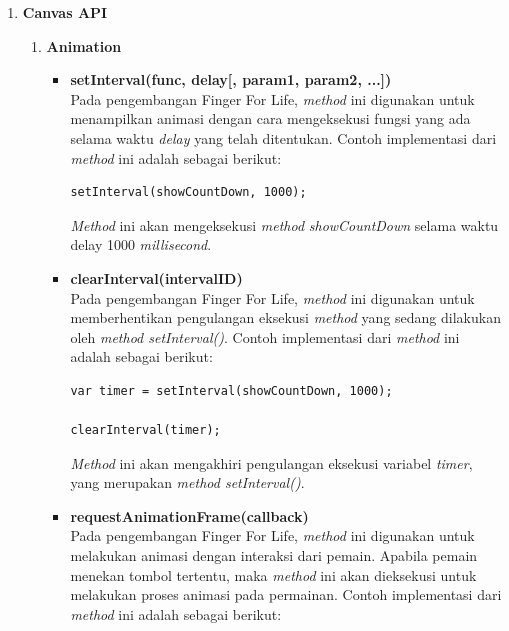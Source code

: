 \begin{enumerate}
	\item \textbf{Canvas API}
	\begin{enumerate}
		\item \textbf{Animation}
		\begin{itemize}
			\item \textbf{setInterval(func, delay[, param1, param2, ...])} \\
			Pada pengembangan Finger For Life, \textit{method} ini digunakan untuk menampilkan animasi dengan cara mengeksekusi fungsi yang ada selama waktu \textit{delay} yang telah ditentukan. Contoh implementasi dari \textit{method} ini adalah sebagai berikut:
\begin{lstlisting}
setInterval(showCountDown, 1000);
\end{lstlisting}
\textit{Method} ini akan mengeksekusi \textit{method} \textit{showCountDown} selama waktu delay 1000 \textit{millisecond}.
			
			\item \textbf{clearInterval(intervalID)} \\
			Pada pengembangan Finger For Life, \textit{method} ini digunakan untuk memberhentikan pengulangan eksekusi \textit{method} yang sedang dilakukan oleh \textit{method setInterval()}. Contoh implementasi dari \textit{method} ini adalah sebagai berikut:
\begin{lstlisting}
var timer = setInterval(showCountDown, 1000);

clearInterval(timer);
\end{lstlisting}
			\textit{Method} ini akan mengakhiri pengulangan eksekusi variabel \textit{timer}, yang merupakan \textit{method setInterval()}.			

			
			\item \textbf{requestAnimationFrame(callback)} \\
			Pada pengembangan Finger For Life, \textit{method} ini digunakan untuk melakukan animasi dengan interaksi dari pemain. Apabila pemain menekan tombol tertentu, maka \textit{method} ini akan dieksekusi untuk melakukan proses animasi pada permainan. Contoh implementasi dari \textit{method} ini adalah sebagai berikut:
			
\begin{lstlisting}

\end{lstlisting}
		\end{itemize}
		

\end{enumerate}
\end{enumerate}
